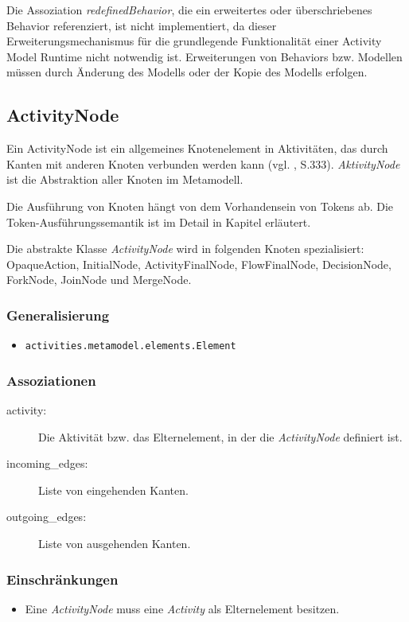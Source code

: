 Die Assoziation \emph{redefinedBehavior}, die ein erweitertes oder überschriebenes Behavior referenziert, ist nicht implementiert, da dieser Erweiterungsmechanismus für die grundlegende Funktionalität einer Activity Model Runtime nicht notwendig ist. Erweiterungen von Behaviors bzw. Modellen müssen durch Änderung des Modells oder der Kopie des Modells erfolgen.


\subsection{ActivityNode}
Ein ActivityNode ist ein allgemeines Knotenelement in Aktivitäten, das durch Kanten mit anderen Knoten verbunden werden kann (vgl. \citep{OMG2009}, S.333). \emph{AktivityNode} ist die Abstraktion aller Knoten im Metamodell.

Die Ausführung von Knoten hängt von dem Vorhandensein von Tokens ab. Die Token-Ausführungssemantik ist im Detail in Kapitel  erläutert.

Die abstrakte Klasse \emph{ActivityNode} wird in folgenden Knoten spezialisiert:
OpaqueAction, InitialNode, ActivityFinalNode, FlowFinalNode, DecisionNode, ForkNode, JoinNode und MergeNode.


\subsubsection{Generalisierung}
\begin{itemize}
\item \texttt{activities.metamodel.elements.Element}
\end{itemize}

\subsubsection{Assoziationen}
\begin{description}
\item[activity:] Die Aktivität bzw. das Elternelement, in der die \emph{ActivityNode} definiert ist.
\item[incoming\_edges:] Liste von eingehenden Kanten.
\item[outgoing\_edges:] Liste von ausgehenden Kanten.
\end{description}

\subsubsection{Einschränkungen}
\begin{itemize}
\item Eine \emph{ActivityNode} muss eine \emph{Activity} als Elternelement besitzen.
\end{itemize}


